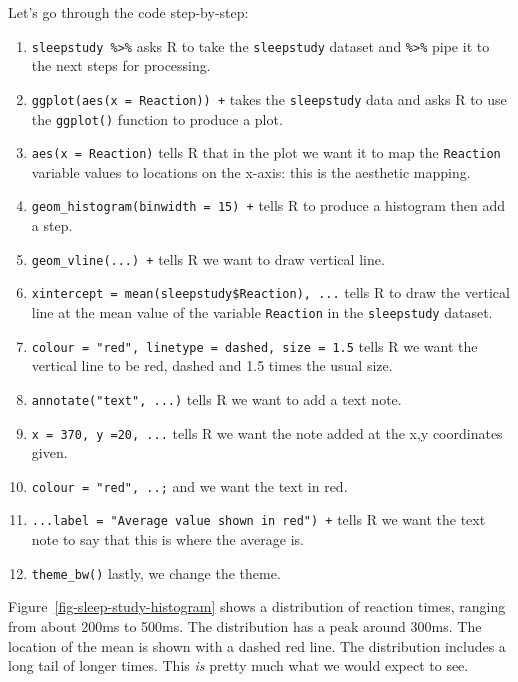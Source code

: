 \documentclass[
  letterpaper,
  DIV=11,
  numbers=noendperiod]{scrreprt}
\providecommand{\tightlist}{%
  \setlength{\itemsep}{0pt}\setlength{\parskip}{0pt}}\usepackage{longtable,booktabs,array}
\begin{document}
Let's go through the code step-by-step:

\begin{enumerate}
\def\labelenumi{\arabic{enumi}.}
\tightlist
\item
  \texttt{sleepstudy\ \%\textgreater{}\%} asks R to take the
  \texttt{sleepstudy} dataset and \texttt{\%\textgreater{}\%} pipe it to
  the next steps for processing.
\item
  \texttt{ggplot(aes(x\ =\ Reaction))\ +} takes the \texttt{sleepstudy}
  data and asks R to use the \texttt{ggplot()} function to produce a
  plot.
\item
  \texttt{aes(x\ =\ Reaction)} tells R that in the plot we want it to
  map the \texttt{Reaction} variable values to locations on the x-axis:
  this is the aesthetic mapping.
\item
  \texttt{geom\_histogram(binwidth\ =\ 15)\ +} tells R to produce a
  histogram then add a step.
\item
  \texttt{geom\_vline(...)\ +} tells R we want to draw vertical line.
\item
  \texttt{xintercept\ =\ mean(sleepstudy\$Reaction),\ ...} tells R to
  draw the vertical line at the mean value of the variable
  \texttt{Reaction} in the \texttt{sleepstudy} dataset.
\item
  \texttt{colour\ =\ "red",\ linetype\ =\ \textquotesingle{}dashed\textquotesingle{},\ size\ =\ 1.5}
  tells R we want the vertical line to be red, dashed and 1.5 times the
  usual size.
\item
  \texttt{annotate("text",\ ...)} tells R we want to add a text note.
\item
  \texttt{x\ =\ 370,\ y\ =20,\ ...} tells R we want the note added at
  the x,y coordinates given.
\item
  \texttt{colour\ =\ "red",\ ..;} and we want the text in red.
\item
  \texttt{...label\ =\ "Average\ value\ shown\ in\ red")\ +} tells R we
  want the text note to say that this is where the average is.
\item
  \texttt{theme\_bw()} lastly, we change the theme.
\end{enumerate}

Figure~\ref{fig-sleep-study-histogram} shows a distribution of reaction
times, ranging from about 200ms to 500ms. The distribution has a peak
around 300ms. The location of the mean is shown with a dashed red line.
The distribution includes a long tail of longer times. This \emph{is}
pretty much what we would expect to see.
\end{document}
